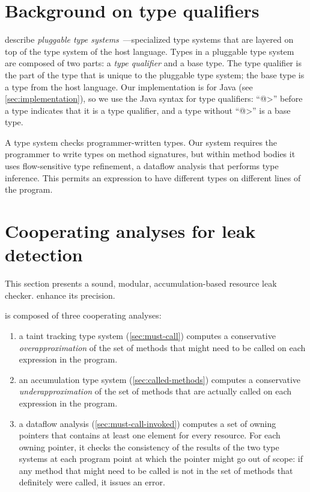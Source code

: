 \section{Background on type qualifiers}
\label{sec:background}

 describe
\emph{pluggable type systems}~\cite{FosterFFA99}---specialized type
systems that are layered on top of the type system of the host
language.  Types in a pluggable type system are composed of two parts:
a \emph{type qualifier} and a base type. The type qualifier is the
part of the type that is unique to the pluggable type system; the base
type is a type from the host language. Our implementation is for Java
(see \cref{sec:implementation}), so we use the Java syntax for type
qualifiers: ``\<@>'' before a type indicates that it is a type
qualifier, and a type without ``\<@>'' is a base type.

A type system checks programmer-written types.  Our system requires the
programmer to write types on method signatures, but within method bodies it
uses flow-sensitive type refinement, a dataflow analysis that performs type
inference.  This permits an expression to have different types on different
lines of the program.



\section{Cooperating analyses for leak detection}
\label{sec:base-type-systems}

This section presents a sound, modular, accumulation-based
resource leak checker.
enhance its precision.

\Tool is composed of three cooperating analyses:
\begin{enumerate}
\item a taint tracking type system (\cref{sec:must-call}) computes a conservative
  \emph{overapproximation} of the set of methods that might need to be called
  on each expression in the program.
\item an accumulation type system (\cref{sec:called-methods}) computes
  a conservative \emph{underapproximation} of the set of methods that are
  actually called on each expression in the program.
\item a dataflow analysis (\cref{sec:must-call-invoked}) computes a set
  of owning pointers that contains at least one element for every resource.
  For each owning pointer, it checks the consistency of the results
  of the two type systems at each program
  point at which the pointer might go out of scope:
  if any method that might need to be called is not in the set of methods
  that definitely were called, it issues an error.
\end{enumerate}

